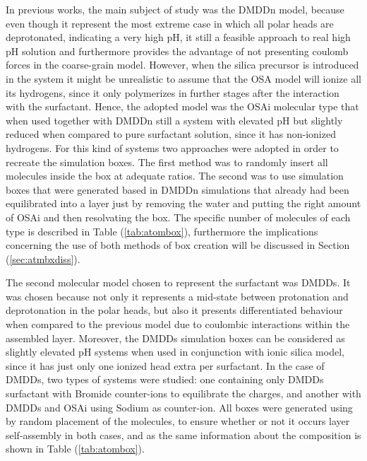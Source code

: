 \documentclass[10pt,a4paper,twoside]{article}
\begin{document}
 In previous works, the main subject of study was the DMDDn model, because even though it represent the most extreme case in which all polar heads are deprotonated, indicating a very high pH, it still a feasible approach to real high pH solution and furthermore provides the advantage of not presenting coulomb forces in the coarse-grain model. However, when the silica precursor is introduced in the system it might be unrealistic to assume that the OSA model will ionize all its hydrogens, since it only polymerizes in further stages after the interaction with the surfactant. Hence, the adopted model was the OSAi molecular type that when used together with DMDDn still a system with elevated pH but slightly reduced when compared to pure surfactant solution, since it has non-ionized hydrogens. For this kind of systems two approaches were adopted in order to recreate the simulation boxes. The first method was to randomly insert all molecules inside the box at adequate ratios. The second was to use simulation boxes that were generated based in DMDDn simulations that already had been equilibrated into a layer just by removing the water and putting the right amount of OSAi and then resolvating the box. The specific number of molecules of each type is described in Table (\ref{tab:atombox}), furthermore the implications concerning the use of both methods of box creation will be discussed in Section (\ref{sec:atmbxdiss}).
 
 The second molecular model chosen to represent the surfactant was DMDDs. It was chosen because not only it represents a mid-state between protonation and deprotonation in the polar heads, but also it presents differentiated behaviour when compared to the previous model due to coulombic interactions within the assembled layer. Moreover, the DMDDs simulation boxes can be considered as slightly elevated pH systems when used in conjunction with ionic silica model, since it has just only one ionized head extra per surfactant. In the case of DMDDs, two types of systems were studied: one containing only DMDDs surfactant with Bromide counter-ions to equilibrate the charges, and another with DMDDs and OSAi using Sodium as counter-ion. All boxes were generated using by random placement of the molecules, to ensure whether or not it occurs layer self-assembly in both cases, and as the same information about the composition is shown in Table (\ref{tab:atombox}).
 
\end{document}
